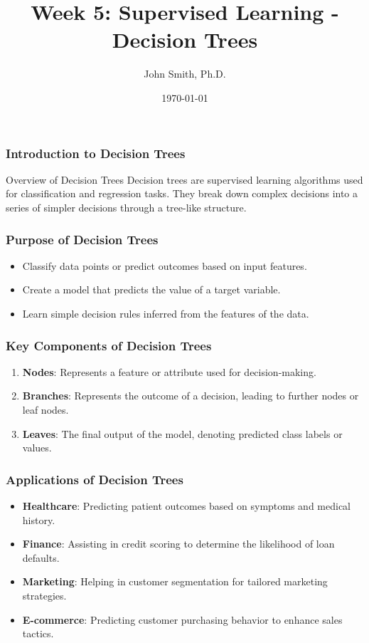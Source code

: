 \documentclass[aspectratio=169]{beamer}
\title[Decision Trees]{Week 5: Supervised Learning - Decision Trees}
\author[J. Smith]{John Smith, Ph.D.}
\institute[University Name]{
  Department of Computer Science\\
  University Name\\
  \vspace{0.3cm}
  Email: email@university.edu\\
  Website: www.university.edu
}
\date{\today}
\begin{document}
\frame{\titlepage}

\begin{frame}[fragile]
    \frametitle{Introduction to Decision Trees}
    \begin{block}{Overview of Decision Trees}
        Decision trees are supervised learning algorithms used for classification and regression tasks.
        They break down complex decisions into a series of simpler decisions through a tree-like structure.
    \end{block}
\end{frame}

\begin{frame}[fragile]
    \frametitle{Purpose of Decision Trees}
    \begin{itemize}
        \item Classify data points or predict outcomes based on input features.
        \item Create a model that predicts the value of a target variable.
        \item Learn simple decision rules inferred from the features of the data.
    \end{itemize}
\end{frame}

\begin{frame}[fragile]
    \frametitle{Key Components of Decision Trees}
    \begin{enumerate}
        \item \textbf{Nodes}: Represents a feature or attribute used for decision-making.
        \item \textbf{Branches}: Represents the outcome of a decision, leading to further nodes or leaf nodes.
        \item \textbf{Leaves}: The final output of the model, denoting predicted class labels or values.
    \end{enumerate}
\end{frame}

\begin{frame}[fragile]
    \frametitle{Applications of Decision Trees}
    \begin{itemize}
        \item \textbf{Healthcare}: Predicting patient outcomes based on symptoms and medical history.
        \item \textbf{Finance}: Assisting in credit scoring to determine the likelihood of loan defaults.
        \item \textbf{Marketing}: Helping in customer segmentation for tailored marketing strategies.
        \item \textbf{E-commerce}: Predicting customer purchasing behavior to enhance sales tactics.
    \end{itemize}
\end{frame}
\end{document}
